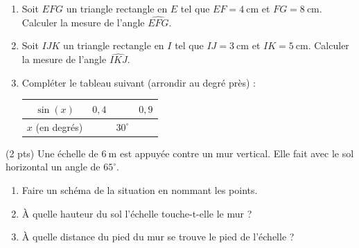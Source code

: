 \documentclass[11pt]{article}
\begin{document}
\begin{exercice}
\begin{enumerate}
  \item Soit $EFG$ un triangle rectangle en $E$ tel que $EF = \SI{4}{\centi\meter}$ et $FG = \SI{8}{\centi\meter}$. Calculer la mesure de l'angle $\widehat{EFG}$.
  \item Soit $IJK$ un triangle rectangle en $I$ tel que $IJ = \SI{3}{\centi\meter}$ et $IK = \SI{5}{\centi\meter}$. Calculer la mesure de l'angle $\widehat{IKJ}$.
  \item Compléter le tableau suivant (arrondir au degré près) :

  \begin{center}
  \begin{tabular}{|c|c|c|c|}
    \hline
    $\sin(x)$ & $0{,}4$ & & $0{,}9$ \\
    \hline
    $x$ (en degrés) & & $30^\circ$ & \\
    \hline
  \end{tabular}
  \end{center}
\end{enumerate}
\end{exercice}

\begin{exercice} \hfill (2 pts)
Une échelle de $\SI{6}{\meter}$ est appuyée contre un mur vertical. Elle fait avec le sol horizontal un angle de $65^\circ$.
\begin{enumerate}
  \item Faire un schéma de la situation en nommant les points.
  \item À quelle hauteur du sol l'échelle touche-t-elle le mur ?
  \item À quelle distance du pied du mur se trouve le pied de l'échelle ?
\end{enumerate}
\end{exercice}
\end{document}
